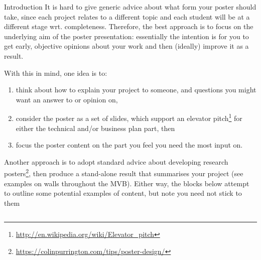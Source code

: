\documentclass[ %
                author={Important Person},
                supervisor={Academic Guide},
                    degree={MEng},
                     title={Some Structural Guidelines for CS Final Year Posters},
                  subtitle={},
                      type={enterprise},
                      year={2023} ]{poster}
\begin{document}

  \begin{frame}{} 
  
    \vfill
    
    \begin{columns}[t]
      \begin{column}{0.900\linewidth}
        \begin{block}{\Large Introduction}
          It is hard to give generic advice about what form your poster should take, since each project relates to a different topic and each student will be at a different stage wrt. completeness.
          Therefore, the best approach is to focus on the underlying aim of the poster presentation: essentially the intention is for you to get early, objective opinions about your work and then (ideally) improve it as a result.
     
          With this in mind, one idea is to:
          \begin{enumerate}
            \item think about how to explain your project to someone, and questions you might want an answer to or opinion on,
            \item consider the poster as a set of slides, which support an elevator        pitch\footnote{\url{http://en.wikipedia.org/wiki/Elevator_pitch}} for either the technical and/or business plan part, then
            \item focus the poster content on the part you feel you need the most input on.
          \end{enumerate}
        
          \noindent
          Another approach is to adopt standard advice about developing research       posters\footnote{\url{https://colinpurrington.com/tips/poster-design/}}, then produce a stand-alone result that summarises your project (see examples on walls throughout the MVB).
          Either way, the blocks below attempt to outline some potential examples of content, but note you need not stick to them
        \end{block}
      \end{column}
    \end{columns}
    
    \vfill
    

\end{frame}
\end{document}
